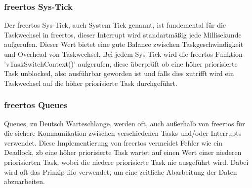 \documentclass[../EDF Master Thesis.tex]{subfiles}
\begin{document}
\subsubsection{\ac{freertos} Sys-Tick} \label{section:freertos_sys_tick}
Der \ac{freertos} Sys-Tick, auch System Tick genannt, ist fundemental für die Taskwechsel in \ac{freertos}, dieser Interrupt wird standartmäßig jede Millisekunde aufgerufen.
Dieser Wert bietet eine gute Balance zwischen Taskgeschwindigkeit und Overhead von Taskwechsel.
Bei jedem Sys-Tick wird die \ac{freertos} Funktion 'vTaskSwitchContext()' aufgerufen, diese überprüft ob eine höher priorisierte Task unblocked, also ausführbar geworden ist und falls dies zutrifft wird ein Taskwechsel auf die höher priorisierte Task durchgeführt.

\subsubsection{\ac{freertos} Queues} \label{section:queues}
Queues, zu Deutsch Warteschlange, werden oft, auch außerhalb von \ac{freertos} für die sichere Kommunikation zwischen verschiedenen Tasks und/oder Interrupts verwendet.
Diese Implementierung von \ac{freertos} vermeidet Fehler wie ein Deadlock, \ac{zb} eine höher priorisierte Task wartet auf einen Wert einer niederen priorisierten Task, wobei die niedere priorisierte Task nie ausgeführt wird.
Dabei wird oft das Prinzip \ac{fifo} verwendet, um eine zeitliche Abarbeitung der Daten abzuarbeiten.
\end{document}
